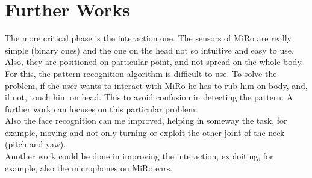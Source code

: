 \documentclass[12pt,peerreviewca, a4paper, onecolumn]{article}
\begin{document}
	\section{Further Works}
	The more critical phase is the interaction one. The sensors of MiRo are really simple (binary ones) and the one on the head not so intuitive and easy to use. Also, they are positioned on particular point, and not spread on the whole body. For this, the pattern recognition algorithm is difficult to use. To solve the problem, if the user wants to interact with MiRo he has to rub him on body, and, if not, touch him on head. This to avoid confusion in detecting the pattern. A further work can focuses on this particular problem.\\
	Also the face recognition can me improved, helping in someway the task, for example, moving and not only turning or exploit the other joint of the neck (pitch and yaw).\\
	Another work could be done in improving the interaction, exploiting, for example, also the microphones on MiRo ears.
 
	 
		

	
\end{document}
